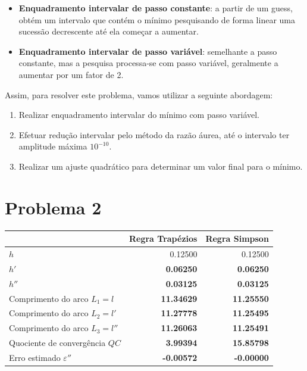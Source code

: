 {\begin{itemize}
    \item \textbf{Enquadramento intervalar de passo constante}: a partir de um guess, obtém um intervalo que contém o mínimo pesquisando de forma linear uma sucessão decrescente até ela começar a aumentar.
    \item \textbf{Enquadramento intervalar de passo variável}: semelhante a passo constante, mas a pesquisa processa-se com passo variável, geralmente a aumentar por um fator de 2.
\end{itemize}
Assim, para resolver este problema, vamos utilizar a seguinte abordagem:
\begin{enumerate}
    \item Realizar enquadramento intervalar do mínimo com passo variável.
    \item Efetuar redução intervalar pelo método da razão áurea, até o intervalo ter amplitude máxima $10^{-10}$.
    \item Realizar um ajuste quadrático para determinar um valor final para o mínimo.
\end{enumerate}


\section{Problema 2}


\begin{center} \begin{tabular}{l | r | r}
    & Regra Trapézios & Regra Simpson \\ \hline
    $h  $ & 0.12500 & 0.12500 \\
    $h' $ & \textbf{0.06250} & \textbf{0.06250} \\
    $h''$ & \textbf{0.03125} & \textbf{0.03125} \\
    Comprimento do arco $L_1=l  $ & \textbf{11.34629} & \textbf{11.25550} \\
    Comprimento do arco $L_2=l' $ & \textbf{11.27778} & \textbf{11.25495} \\
    Comprimento do arco $L_3=l''$ & \textbf{11.26063} & \textbf{11.25491} \\
    Quociente de convergência $QC$ & \textbf{3.99394} & \textbf{15.85798} \\
    Erro estimado $\varepsilon''$ & \textbf{-0.00572} & \textbf{-0.00000}
\end{tabular} \end{center}

}
